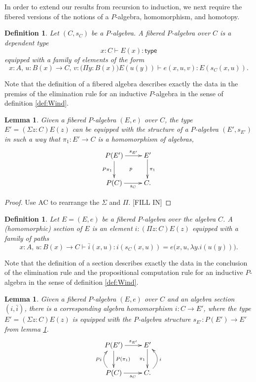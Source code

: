 \documentclass[10pt,a4paper,oneside,reqno]{amsart}
\numberwithin{equation}{section}
\theoremstyle{mythm}
\newtheorem{lemma}[theorem]{Lemma}
\theoremstyle{mydef}
\newtheorem{definition}[theorem]{Definition}
\theoremstyle{myrmk}
\newcommand{\peq}{=}
\newcommand{\co}{\colon}
\newcommand{\type}{\mathsf{type}}
\begin{document}

In order to extend our results from recursion to induction, we next require the fibered versions of the notions of a $P$-algebra, homomorphism, and homotopy.

\begin{definition} \label{def:fibalg}
Let $(C, s_C)$ be a $P$-algebra. A \emph{fibered $P$-algebra} over $C$ is a dependent type
\[
x : C \vdash E(x) \co \type
\]
equipped with a family of elements of the form
\[
x:A,\, u : B(x) \to C,\, v : \big(\Pi{y:B(x)}\big) E(u(y)) \vdash e(x,u,v) :E(s_C(x,u)).
\]
\end{definition}

Note that the definition of a fibered algebra describes exactly the data in the premiss of the elimination rule for an inductive $P$-algebra in the sense of definition \ref{def:Wind}. 

\begin{lemma}\label{lem:fibalg}
Given a fibered $P$-algebra $(E, e)$ over $C$, the type $E' = (\Sigma z : C) E(z)$ can be equipped with the structure of a $P$-algebra $(E', s_{E'})$ in such a way that $\pi_1 : E'\to C$ is a homomorphism of algebras,
\[
\xymatrix{
P(E') \ar[d]_{P\pi_1} \ar[r]^-{s_{E'}} \ar@{}[rd]|{p} & E' \ar[d]^{\pi_1} \\ 
P(C) \ar[r]_-{s_C} & C.}
 \]
\end{lemma}

\begin{proof}
Use AC to rearrange the $\Sigma$ and $\Pi$.
[FILL IN]
\end{proof}

\begin{definition} \label{def:fibalgsection} Let $E = (E, e)$ be a fibered $P$-algebra over the algebra $C$.  A \emph{(homomorphic) section} of $E$ is an element $i \co (\Pi z \co C) E(z)$ equipped with a family of paths $$ x:A,\, u : B(x) \to C \vdash \bar{i}(x, u) : i(s_C(x,u)) \peq e\big(x,u,\lambda{y}.i(u(y))\big).$$
\end{definition} 

Note that the definition of a section describes exactly the data in the conclusion of the elimination rule and the propositional computation rule for an inductive $P$-algebra in the sense of definition \ref{def:Wind}. 

\begin{lemma}\label{lem:fibalghom}
Given a fibered $P$-algebra $(E, e)$ over $C$ and an algebra section $(i, \bar{i})$, there is a corresponding algebra homomorphism $i : C\to E'$, where the type $E' = (\Sigma z : C) E(z)$ is equipped with the $P$-algebra structure $s_{E'} :P(E')\to E'$ from lemma \ref{lem:fibalg}.
\[
\xymatrix{
P(E') \ar[d]^{P(\pi_1)} \ar[r]^-{s_{E'}} %
	 & E' \ar[d]_{\pi_1} \\ 
P(C)  \ar@/^1.2pc/[u]^{Pi} \ar[r]_-{s_C} & C  \ar@/_1.2pc/[u]_{i}.}
 \]
\end{lemma}
\end{document}

